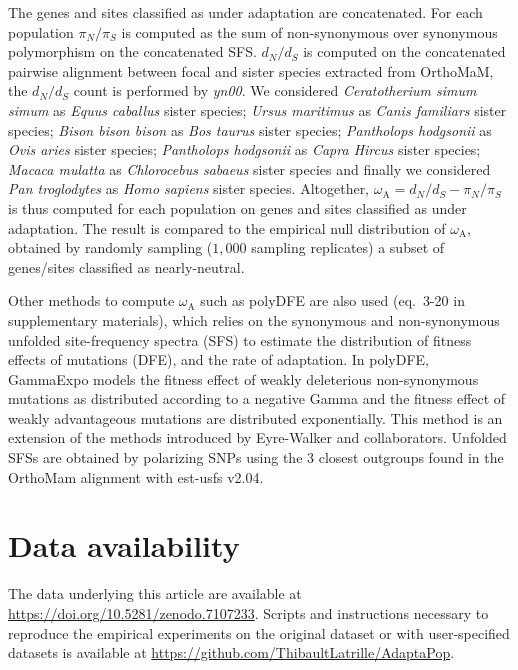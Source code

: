 \documentclass[9pt,twocolumn,twoside,lineno]{pnas-new}
\newcommand{\dn}{d_N}
\newcommand{\ds}{d_S}
\newcommand{\dnds}{\dn / \ds}
\newcommand{\rateApop}{\omega_{\mathrm{A}}}
\newcommand{\pn}{\pi_N}
\newcommand{\ps}{\pi_S}
\newcommand{\pnps}{\pn / \ps}
\begin{document}
{       The genes and sites classified as under adaptation are concatenated.
       For each population $\pnps$ is computed as the sum of non-synonymous over synonymous polymorphism on the concatenated SFS\@.
       $\dnds$ is computed on the concatenated pairwise alignment between focal and sister species extracted from OrthoMaM, the $\dnds$ count is performed by \textit{yn00}.
       We considered \textit{Ceratotherium simum simum} as \textit{Equus caballus} sister species; \textit{Ursus maritimus} as \textit{Canis familiars} sister species; \textit{Bison bison bison} as \textit{Bos taurus} sister species; \textit{Pantholops hodgsonii} as \textit{Ovis aries} sister species; \textit{Pantholops hodgsonii} as \textit{Capra Hircus} sister species; \textit{Macaca mulatta} as \textit{Chlorocebus sabaeus} sister species and finally we considered \textit{Pan troglodytes} as \textit{Homo sapiens} sister species.
       Altogether, $\rateApop = \dnds - \pnps$ is thus computed for each population on genes and sites classified as under adaptation.
       The result is compared to the empirical null distribution of $\rateApop$, obtained by randomly sampling ($1,000$ sampling replicates) a subset of genes/sites classified as nearly-neutral.

       Other methods to compute $\rateApop$ such as polyDFE\cite{tataru_polydfe_2020} are also used (eq.~3-20 in supplementary materials), which relies on the synonymous and non-synonymous unfolded site-frequency spectra (SFS) to estimate the distribution of fitness effects of mutations (DFE), and the rate of adaptation.
       In polyDFE, GammaExpo models the fitness effect of weakly deleterious non-synonymous mutations as distributed according to a negative Gamma and the fitness effect of weakly advantageous mutations are distributed exponentially.
       This method is an extension of the methods introduced by Eyre-Walker and collaborators\cite{eyre-walker_distribution_2006, eyre-walker_estimating_2009}.
       Unfolded SFSs are obtained by polarizing SNPs using the $3$ closest outgroups found in the OrthoMam alignment with est-usfs v2.04\cite{keightley_inferring_2018}.

       \section{Data availability}\label{sec:data-availability}
       The data underlying this article are available at \url{https://doi.org/10.5281/zenodo.7107233}.
       Scripts and instructions necessary to reproduce the empirical experiments on the original dataset or with user-specified datasets is available at \url{https://github.com/ThibaultLatrille/AdaptaPop}.

}
\end{document}
